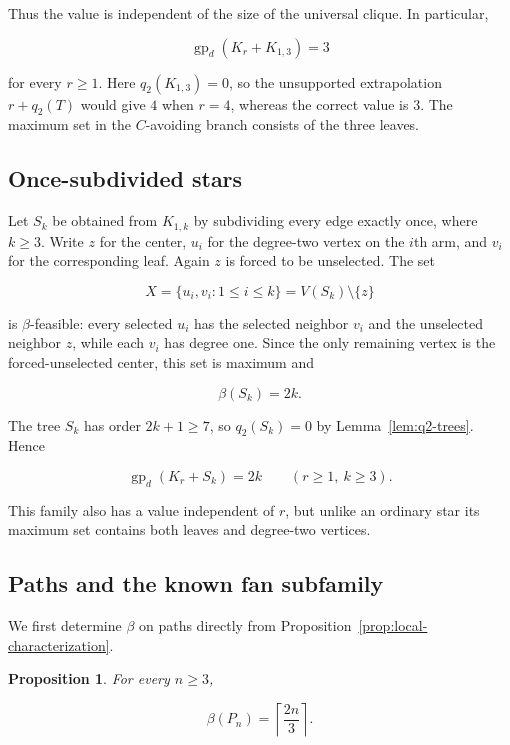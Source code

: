\documentclass[11pt,a4paper]{article}
\newtheorem{proposition}[theorem]{Proposition}
\numberwithin{equation}{section}
\begin{document}
Thus the value is independent of the size of the universal clique. In
particular,

\[
\operatorname{gp}_d(K_r+K_{1,3})=3
\]

for every \(r\ge 1\). Here \(q_2(K_{1,3})=0\), so the unsupported extrapolation
\(r+q_2(T)\) would give \(4\) when \(r=4\), whereas the correct value is
\(3\). The maximum set in the \(C\)-avoiding branch consists of the three
leaves.

\subsection{Once-subdivided stars}\label{sec:subdivided-stars}

Let \(S_k\) be obtained from \(K_{1,k}\) by subdividing every edge
exactly once, where \(k\ge 3\). Write \(z\) for the center, \(u_i\) for
the degree-two vertex on the \(i\)th arm, and \(v_i\) for the
corresponding leaf. Again \(z\) is forced to be unselected. The set

\[
X=\{u_i,v_i:1\le i\le k\}=V(S_k)\setminus\{z\}
\]

is \(\beta\)-feasible: every selected \(u_i\) has the selected neighbor
\(v_i\) and the unselected neighbor \(z\), while each \(v_i\) has degree
one. Since the only remaining vertex is the forced-unselected center,
this set is maximum and

\[
\beta(S_k)=2k.
\]

The tree \(S_k\) has order \(2k+1\ge 7\), so \(q_2(S_k)=0\) by
Lemma~\ref{lem:q2-trees}. Hence

\begin{equation}\label{eq:subdivided-star-family}
\operatorname{gp}_d(K_r+S_k)=2k
\qquad (r\ge 1,\ k\ge 3).
\end{equation}

This family also has a value independent of \(r\), but unlike an
ordinary star its maximum set contains both leaves and degree-two
vertices.

\subsection{Paths and the known fan subfamily}\label{sec:paths}

We first determine \(\beta\) on paths directly from Proposition~\ref{prop:local-characterization}.

\begin{proposition}\label{prop:beta-path}
For every \(n\ge 3\),

\[
\beta(P_n)=\left\lceil\frac{2n}{3}\right\rceil.
\]
\end{proposition}
\end{document}
